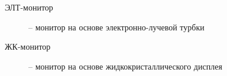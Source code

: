 
\begin{description}
\item[ЭЛТ-монитор] -- монитор на основе электронно-лучевой турбки
\item[ЖК-монитор] -- монитор на основе жидкокристаллического дисплея
\end{description}

\clearpage


\clearpage
